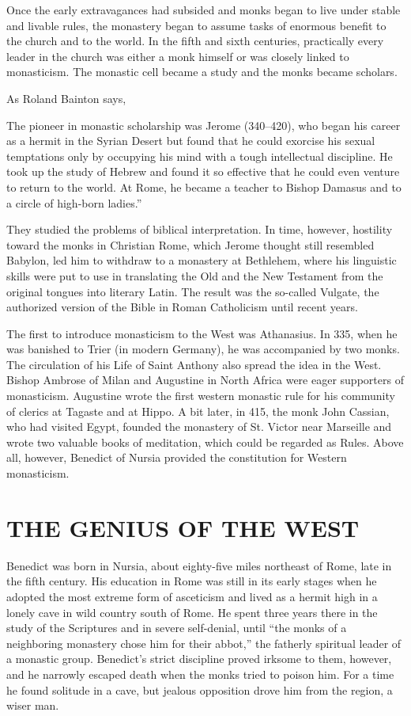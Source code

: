 Once the early extravagances had subsided and monks began to live under stable and livable rules,
the monastery began to assume tasks of enormous benefit to the church and to the world. In the fifth
and sixth centuries, practically every leader in the church was either a monk himself or was closely
linked to monasticism. The monastic cell became a study and the monks became scholars.

As Roland Bainton says,

\begin{blockquote}
The pioneer in monastic scholarship was Jerome (340–420), who began his career as a hermit in the
Syrian Desert but found that he could exorcise his sexual temptations only by occupying his mind
with a tough intellectual discipline. He took up the study of Hebrew and found it so effective that
he could even venture to return to the world. At Rome, he became a teacher to Bishop Damasus and to
a circle of high-born ladies.”
\end{blockquote}

They studied the problems of biblical interpretation. In time, however, hostility toward the monks
in Christian Rome, which Jerome thought still resembled Babylon, led him to withdraw to a monastery
at Bethlehem, where his linguistic skills were put to use in translating the Old and the New
Testament from the original tongues into literary Latin. The result was the so-called Vulgate, the
authorized version of the Bible in Roman Catholicism until recent years.

The first to introduce monasticism to the West was Athanasius. In 335, when he was banished to Trier
(in modern Germany), he was accompanied by two monks. The circulation of his Life of Saint Anthony
also spread the idea in the West. Bishop Ambrose of Milan and Augustine in North Africa were eager
supporters of monasticism. Augustine wrote the first western monastic rule for his community of
clerics at Tagaste and at Hippo. A bit later, in 415, the monk John Cassian, who had visited Egypt,
founded the monastery of St. Victor near Marseille and wrote two valuable books of meditation, which
could be regarded as Rules. Above all, however, Benedict of Nursia provided the constitution for
Western monasticism.

\section{THE GENIUS OF THE WEST}

Benedict was born in Nursia, about eighty-five miles northeast of Rome, late in the fifth century.
His education in Rome was still in its early stages when he adopted the most extreme form of
asceticism and lived as a hermit high in a lonely cave in wild country south of Rome. He spent three
years there in the study of the Scriptures and in severe self-denial, until “the monks of a
neighboring monastery chose him for their abbot,” the fatherly spiritual leader of a monastic group.
Benedict’s strict discipline proved irksome to them, however, and he narrowly escaped death when the
monks tried to poison him. For a time he found solitude in a cave, but jealous opposition drove him
from the region, a wiser man.

